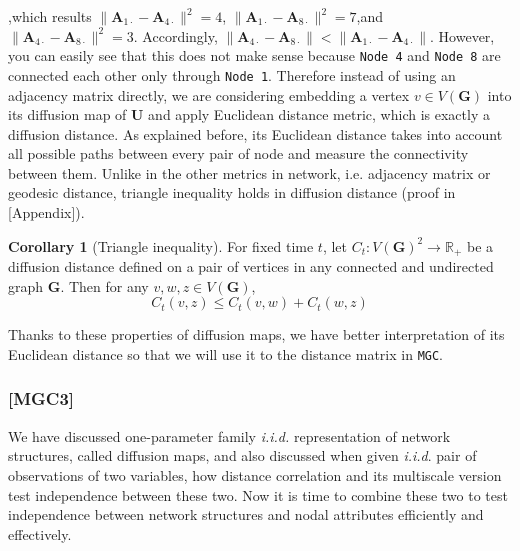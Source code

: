 \documentclass[12pt]{article}
\theoremstyle{definition}
\newtheorem{corollary}{Corollary}[theorem]
\begin{document}
,which results $\parallel \boldsymbol{A}_{1 \cdot} -\boldsymbol{A}_{4 \cdot} \parallel^2 = 4$, $\parallel \boldsymbol{A}_{1 \cdot} -\boldsymbol{A}_{8 \cdot} \parallel^2 = 7$,and $\parallel \boldsymbol{A}_{4 \cdot} -\boldsymbol{A}_{8 \cdot} \parallel^2 = 3.$ Accordingly, $\parallel \boldsymbol{A}_{4 \cdot} -\boldsymbol{A}_{8 \cdot} \parallel  < \parallel \boldsymbol{A}_{1 \cdot} -\boldsymbol{A}_{4 \cdot} \parallel$. However, you can easily see that this does not make sense because \texttt{Node 4} and \texttt{Node 8} are connected each other only through \texttt{Node 1}. 
Therefore instead of using an adjacency matrix directly, we are considering embedding a vertex $v \in V(\boldsymbol{G})$ into its diffusion map of $\boldsymbol{U}$ and apply Euclidean distance metric, which is exactly a diffusion distance. As explained before, its Euclidean distance takes into account all possible paths between every pair of node and measure the connectivity between them. Unlike in the other metrics in network, i.e. adjacency matrix or geodesic distance, triangle inequality holds in diffusion distance (proof in [Appendix]). 

\begin{corollary}[Triangle inequality]
\label{corollary1}
For fixed time $t$, let $C_{t} : V(\mathbf{G})^2 \rightarrow \mathbb{R}_{+}$ be a diffusion distance defined on a pair of vertices in any connected and undirected graph $\mathbf{G}$. Then for any $v, w, z \in V(\mathbf{G})$,  
\begin{equation}
C_{t}(v,z) \leq C_{t}(v,w) + C_{t}(w,z)
\end{equation}
\end{corollary}	

Thanks to these properties of diffusion maps, we have better interpretation of its Euclidean distance so that we will use it to the distance matrix in \texttt{MGC}.

\subsubsection{[MGC3]}


We have discussed one-parameter family \textit{i.i.d.} representation of network structures, called diffusion maps, and also discussed when given \textit{i.i.d}. pair of observations of two variables, how distance correlation and its multiscale version test independence between these two. Now it is time to combine these two to test independence between network structures and nodal attributes efficiently and effectively.
\end{document}
